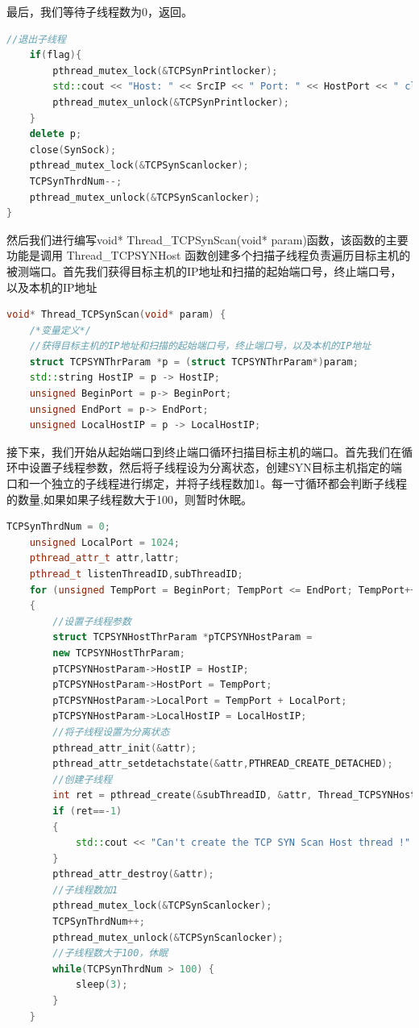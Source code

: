 \documentclass[UTF8,a4paper,10pt]{ctexart}
\begin{document}
最后，我们等待子线程数为0，返回。
\begin{lstlisting}[language = C++]
   //退出子线程
    if(flag){
        pthread_mutex_lock(&TCPSynPrintlocker);
        std::cout << "Host: " << SrcIP << " Port: " << HostPort << " closed !" << std::endl;
        pthread_mutex_unlock(&TCPSynPrintlocker);
    }
    delete p;
    close(SynSock);
    pthread_mutex_lock(&TCPSynScanlocker);
    TCPSynThrdNum--;
    pthread_mutex_unlock(&TCPSynScanlocker);
}
\end{lstlisting}
然后我们进行编写void* Thread\_TCPSynScan(void* param)函数，该函数的主要功能是调用 Thread\_TCPSYNHost 函数创建多个扫描子线程负责遍历目标主机的被测端口。首先我们获得目标主机的IP地址和扫描的起始端口号，终止端口号，以及本机的IP地址
\begin{lstlisting}[language = C++]
   void* Thread_TCPSynScan(void* param) {
    /*变量定义*/
    //获得目标主机的IP地址和扫描的起始端口号，终止端口号，以及本机的IP地址
    struct TCPSYNThrParam *p = (struct TCPSYNThrParam*)param;
    std::string HostIP = p -> HostIP;
    unsigned BeginPort = p-> BeginPort;
	unsigned EndPort = p-> EndPort;
	unsigned LocalHostIP = p -> LocalHostIP;
\end{lstlisting}
接下来，我们开始从起始端口到终止端口循环扫描目标主机的端口。首先我们在循环中设置子线程参数，然后将子线程设为分离状态，创建SYN目标主机指定的端口和一个独立的子线程进行绑定，并将子线程数加1。每一寸循环都会判断子线程的数量,如果如果子线程数大于100，则暂时休眠。
\begin{lstlisting}[language = C++]
   TCPSynThrdNum = 0;
    unsigned LocalPort = 1024;
    pthread_attr_t attr,lattr;
    pthread_t listenThreadID,subThreadID;
    for (unsigned TempPort = BeginPort; TempPort <= EndPort; TempPort++)
    {
        //设置子线程参数
        struct TCPSYNHostThrParam *pTCPSYNHostParam =
        new TCPSYNHostThrParam;
        pTCPSYNHostParam->HostIP = HostIP;
        pTCPSYNHostParam->HostPort = TempPort;
        pTCPSYNHostParam->LocalPort = TempPort + LocalPort;
        pTCPSYNHostParam->LocalHostIP = LocalHostIP;
        //将子线程设置为分离状态
        pthread_attr_init(&attr);
        pthread_attr_setdetachstate(&attr,PTHREAD_CREATE_DETACHED);
        //创建子线程
        int ret = pthread_create(&subThreadID, &attr, Thread_TCPSYNHost, pTCPSYNHostParam);
        if (ret==-1) 
		{
			std::cout << "Can't create the TCP SYN Scan Host thread !" << std::endl;
		}
        pthread_attr_destroy(&attr);
        //子线程数加1
        pthread_mutex_lock(&TCPSynScanlocker);
        TCPSynThrdNum++;
        pthread_mutex_unlock(&TCPSynScanlocker);
        //子线程数大于100，休眠
        while(TCPSynThrdNum > 100) { 
            sleep(3); 
        }
    }
\end{lstlisting}
\end{document}
